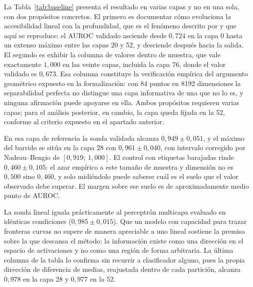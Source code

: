 \documentclass[12pt,a4paper]{article}
\newcommand{\textcite}[1]{\citet{#1}}
\begin{document}
La Tabla~\ref{tab:baseline} presenta el resultado en varias capas y no en una sola, con dos propósitos concretos. El primero es documentar cómo evoluciona la accesibilidad lineal con la profundidad, que es el fenómeno descrito por \textcite{alain2017} y que aquí se reproduce: el AUROC validado asciende desde $0{,}724$ en la capa 0 hasta un extenso máximo entre las capas 20 y 52, y desciende después hacia la salida. El segundo es exhibir la columna de valores dentro de muestra, que vale exactamente $1{,}000$ en las veinte capas, incluida la capa 76, donde el valor validado es $0{,}673$. Esa columna constituye la verificación empírica del argumento geométrico expuesto en la formalización: con 84 puntos en 8192 dimensiones la separabilidad perfecta no distingue una capa informativa de una que no lo es, y ninguna afirmación puede apoyarse en ella. Ambos propósitos requieren varias capas; para el análisis posterior, en cambio, la capa queda fijada en la 52, conforme al criterio expuesto en el apartado anterior.

En esa capa de referencia la sonda validada alcanza $0{,}949 \pm 0{,}051$, y el máximo del barrido se sitúa en la capa 28 con $0{,}961 \pm 0{,}040$, con intervalo corregido por Nadeau--Bengio de $[0{,}919;\ 1{,}000]$. El control con etiquetas barajadas rinde $0{,}460 \pm 0{,}105$: el azar empírico a este tamaño de muestra y dimensión no es $0{,}500$ sino $0{,}460$, y solo midiéndolo puede saberse cuál es el suelo que el valor observado debe superar. El margen sobre ese suelo es de aproximadamente medio punto de AUROC.

La sonda lineal iguala prácticamente al perceptrón multicapa evaluado en idénticas condiciones ($0{,}985 \pm 0{,}015$). Que un modelo con capacidad para trazar fronteras curvas no supere de manera apreciable a uno lineal sostiene la premisa sobre la que descansa el método: la información existe como una dirección en el espacio de activaciones y no como una región de forma arbitraria. La última columna de la tabla lo confirma sin recurrir a clasificador alguno, pues la propia dirección de diferencia de medias, reajustada dentro de cada partición, alcanza $0{,}978$ en la capa 28 y $0{,}977$ en la 52.
\end{document}
